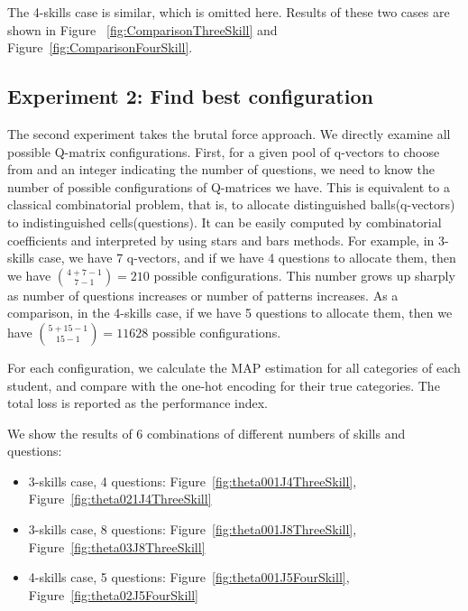\documentclass{edm_template}
\newcommand{\Michel}[1]{{\textcolor{red}{[#1]}}}
\begin{document}
The 4-skills case is similar, which is omitted here. Results of these two cases are shown in Figure ~\ref{fig:ComparisonThreeSkill} and Figure~\ref{fig:ComparisonFourSkill}.

\subsection{Experiment 2: Find best configuration}
The second experiment takes the brutal force approach. We directly examine all possible Q-matrix configurations. First, for a given pool of q-vectors to choose from and an integer indicating the number of questions, we need to know the number of possible configurations of Q-matrices we have. This is equivalent to a classical combinatorial problem, that is, to allocate distinguished balls(q-vectors) to indistinguished cells(questions). It can be easily computed by combinatorial coefficients and interpreted by using stars and bars methods. For example, in 3-skills case, we have 7 q-vectors, and if we have 4 questions to allocate them, then we have ${{4+7-1}\choose {7-1}}=210$ possible configurations. This number grows up sharply as number of questions increases or number of patterns increases. As a comparison, in the 4-skills case, if we have 5 questions to allocate them, then we have ${{5+15-1}\choose {15-1}}=11628$ possible configurations. 

For each configuration, we calculate the MAP estimation for all categories of each student, and compare with the one-hot encoding for their true categories. The total loss is reported as the performance index.

We show the results of 6 combinations of different numbers of skills and questions: 
\begin{itemize}
\item 3-skills case, 4 questions: Figure~\ref{fig:theta001J4ThreeSkill}, Figure~\ref{fig:theta021J4ThreeSkill}
\item 3-skills case, 8 questions: Figure~\ref{fig:theta001J8ThreeSkill}, Figure~\ref{fig:theta03J8ThreeSkill}
\item 4-skills case, 5 questions: Figure~\ref{fig:theta001J5FourSkill}, Figure~\ref{fig:theta02J5FourSkill}
\end{itemize}

\end{document}
